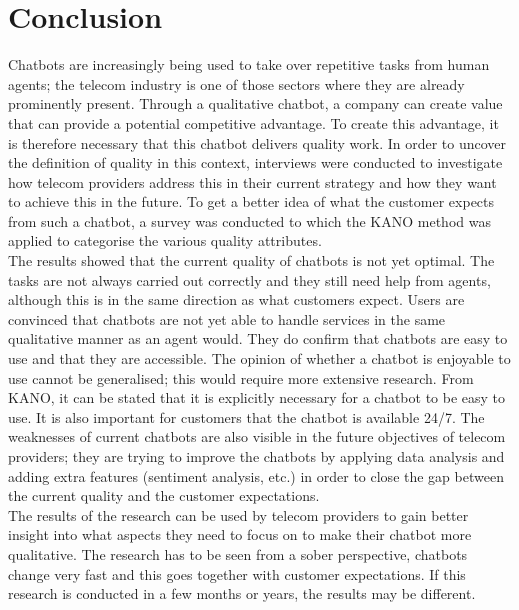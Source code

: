 \mainmatter
\pagestyle{headings}
\chapter{Conclusion}
\label{ch:conclusion}
Chatbots are increasingly being used to take over repetitive tasks from human agents; the telecom industry is one of those sectors where they are already prominently present. Through a qualitative chatbot, a company can create value that can provide a potential competitive advantage. To create this advantage, it is therefore necessary that this chatbot delivers quality work. In order to uncover the definition of quality in this context, interviews were conducted to investigate how telecom providers address this in their current strategy and how they want to achieve this in the future. To get a better idea of what the customer expects from such a chatbot, a survey was conducted to which the KANO method was applied to categorise the various quality attributes.\\
\break
The results showed that the current quality of chatbots is not yet optimal. The tasks are not always carried out correctly and they still need help from agents, although this is in the same direction as what customers expect. Users are convinced that chatbots are not yet able to handle services in the same qualitative manner as an agent would. They do confirm that chatbots are easy to use and that they are accessible. The opinion of whether a chatbot is enjoyable to use cannot be generalised; this would require more extensive research. From KANO, it can be stated that it is explicitly necessary for a chatbot to be easy to use. It is also important for customers that the chatbot is available 24/7. The weaknesses of current chatbots are also visible in the future objectives of telecom providers; they are trying to improve the chatbots by applying data analysis and adding extra features (sentiment analysis, etc.) in order to close the gap between the current quality and the customer expectations.\\
\break
The results of the research can be used by telecom providers to gain better insight into what aspects they need to focus on to make their chatbot more qualitative. The research has to be seen from a sober perspective, chatbots change very fast and this goes together with customer expectations. If this research is conducted in a few months or years, the results may be different.